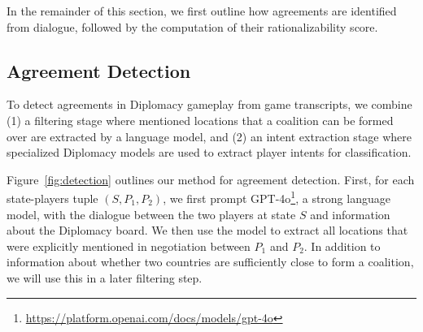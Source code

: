 


In the remainder of this section, we first outline how agreements are identified from dialogue, followed by the computation of their rationalizability score.

\subsection{Agreement Detection}\label{sec:agreement}
To detect agreements in Diplomacy gameplay from game transcripts, we combine (1) a filtering stage where mentioned locations that a coalition can be formed over are extracted by a language model, and (2) an intent extraction stage where specialized Diplomacy models are used to extract player intents for classification. 

Figure~\ref{fig:detection} outlines our method for agreement detection. First, for each state-players tuple $(S, P_1, P_2)$, we first prompt GPT-4o\footnote{\url{https://platform.openai.com/docs/models/gpt-4o}}, a strong language model, with the dialogue between the two players at state $S$ and information about the Diplomacy board. We then use the model to extract all locations that were explicitly mentioned in negotiation between $P_1$ and $P_2$. In addition to information about whether two countries are sufficiently close to form a coalition, we will use this in a later filtering step. 

